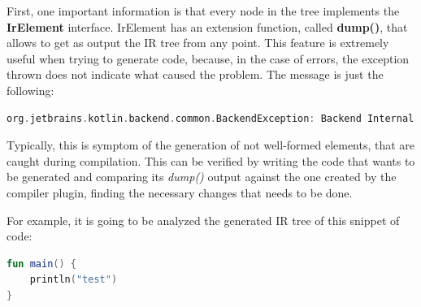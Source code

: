 First, one important information is that every node in the tree implements the \textbf{IrElement} interface. IrElement has an extension function, called \textbf{dump()}, that allows to get as output the IR tree from any point.\newline
This feature is extremely useful when trying to generate code, because, in the case of errors, the exception thrown does not indicate what caused the problem. The message is just the following:
\begin{lstlisting}[caption={Kotlin IR lowering Exception}, language=Kotlin, captionpos=b, label={code:ir_lowering_exception}]
org.jetbrains.kotlin.backend.common.BackendException: Backend Internal error: Exception during IR lowering
\end{lstlisting}
Typically, this is symptom of the generation of not well-formed elements, that are caught during compilation. This can be verified by writing the code that wants to be generated and comparing its \textit{dump()} output against the one created by the compiler plugin, finding the necessary changes that needs to be done.

For example, it is going to be analyzed the generated IR tree of this snippet of code:
\begin{lstlisting}[caption={Kotlin basic code to demostrate the Kotlin IR representation}, language=Kotlin, captionpos=b, label={code:kotlin_for_ir_tree}]
fun main() {
    println("test")
}
\end{lstlisting}

